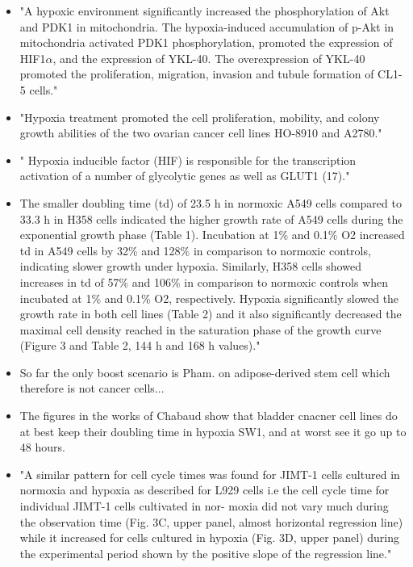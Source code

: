 \documentclass[11pt,a4paper]{article}
\begin{document}
\begin{itemize}
\item "A hypoxic environment significantly increased the phosphorylation of Akt and PDK1 in mitochondria. The hypoxia-induced accumulation of p-Akt in mitochondria activated PDK1 phosphorylation, promoted the expression of HIF1$\alpha$, and the expression of YKL-40. The overexpression of YKL-40 promoted the proliferation, migration, invasion and tubule formation of CL1-5 cells." \cite{Miao2020}

\item "Hypoxia treatment promoted the cell proliferation, mobility, and colony growth abilities of the two ovarian cancer cell lines HO-8910 and A2780."\cite{Li2023}

\item " Hypoxia inducible factor (HIF) is responsible for the transcription activation of a number of glycolytic genes as well as GLUT1 (17)."\cite{Jozwiak2014}

\item The smaller doubling time (td) of 23.5 h in normoxic A549 cells compared to 33.3 h in H358 cells indicated the higher growth rate of A549 cells during the exponential growth phase (Table 1). Incubation at 1\% and 0.1\% O2 increased td in A549 cells by 32\% and 128\% in comparison to normoxic controls, indicating slower growth under hypoxia. Similarly, H358 cells showed increases in td of 57\% and 106\% in comparison to normoxic controls when incubated at 1\% and 0.1\% O2, respectively. Hypoxia significantly slowed the growth rate in both cell lines (Table 2) and it also significantly decreased the maximal cell density reached in the saturation phase of the growth curve (Figure 3 and Table 2, 144 h and 168 h values)."\cite{Nisar2023}

\item So far the only boost scenario is Pham. on adipose-derived stem cell which therefore is not cancer cells... \cite{Pham2016}

\item The figures in the works of Chabaud show that bladder cnacner cell lines do at best keep their doubling time in hypoxia SW1, and at worst see it go up to 48 hours.\cite{Chabaud2022}

\item "A similar pattern for cell cycle times was found for JIMT-1
cells cultured in normoxia and hypoxia as described for L929 cells
i.e the cell cycle time for individual JIMT-1 cells cultivated in nor-
moxia did not vary much during the observation time (Fig. 3C,
upper panel, almost horizontal regression line) while it increased
for cells cultured in hypoxia (Fig. 3D, upper panel) during the
experimental period shown by the positive slope of the regression
line."\cite{Kamlund2017}


\end{itemize}
\end{document}
